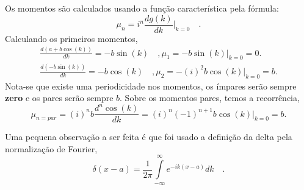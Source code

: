 \documentclass[12pt]{article}
\begin{document}
Os momentos são calculados usando a função característica pela fórmula:
\begin{equation}
\mu_n = i^n \frac{dg(k)}{dk}\Big\rvert_{k=0} \quad.
\end{equation}
Calculando os primeiros momentos,
\begin{equation}
\begin{split}
\frac{d (a + b\cos(k))}{dk} = -b\sin(k) \quad,
\mu_1 = -b\sin(k)\rvert_{k=0} = 0.\\ 
\frac{d (-b\sin(k))}{dk} = -b\cos(k) \quad, \mu_2 = -(i)^2b\cos(k)\rvert_{k=0} = b. 
\end{split}
\end{equation}
Nota-se que existe uma periodicidade nos momentos, os ímpares serão sempre \textbf{zero} e os pares serão sempre $b$.   Sobre os momentos pares, temos a recorrência,
\begin{equation}
\mu_{n=par} = (i)^n b\frac{d^n\cos(k)}{dk} = (i)^n(-1)^{n+1} b\cos(k)\rvert_{k=0} = b.  
\end{equation}


Uma pequena observação a ser feita é que foi usado a definição da delta pela normalização de Fourier,
\begin{equation}
\delta(x-a) = \frac{1}{2\pi}\int\limits_{-\infty}^{\infty} e^{-ik(x-a)}dk \quad.
\end{equation}
\end{document}
